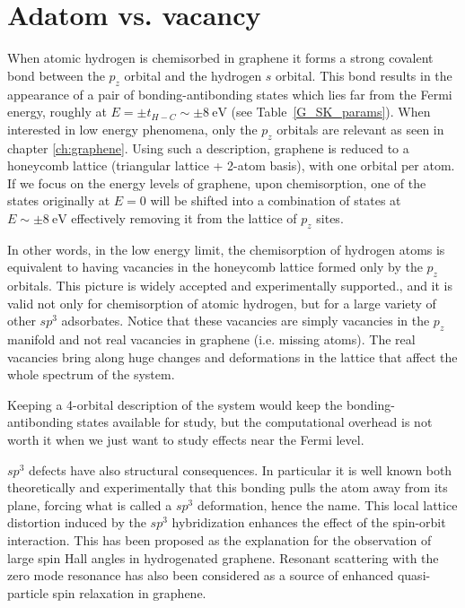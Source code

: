 \section{Adatom vs. vacancy}
When atomic hydrogen is chemisorbed in graphene it forms a strong covalent bond between the $p_z$ orbital and the hydrogen $s$ orbital. This bond results in the appearance of a pair of bonding-antibonding states which lies far from the Fermi energy, roughly at $E=\pm t_{H-C} \sim \pm\SI{8}{\eV}$ (see Table~\ref{G_SK_params}). When interested in low energy phenomena, only the $p_z$ orbitals are relevant as seen in chapter \ref{ch:graphene}. Using such a description, graphene is reduced to a honeycomb lattice (triangular lattice + 2-atom basis), with one orbital per atom.
If we focus on the energy levels of graphene, upon chemisorption, one of the states originally at $E=0$ will be shifted into a combination of states at $E\sim\pm\SI{8}{\eV}$ effectively removing it from the lattice of $p_z$ sites.

In other words, in the low energy limit, the chemisorption of hydrogen atoms is equivalent to having vacancies in the honeycomb lattice formed only by the $p_z$ orbitals.
This picture is widely accepted and experimentally supported.\cite{Pereira2006, Kumazaki2007, Wehling2007, Pereira2008, Palacios2008}, and it is valid not only for chemisorption of atomic hydrogen, but for a large variety of other $sp^3$ adsorbates. \cite{Santos2012}
Notice that these vacancies are simply vacancies in the $p_z$ manifold and not real vacancies in graphene (i.e. missing atoms). The real vacancies bring along huge changes and deformations in the lattice that affect the whole spectrum of the system.

Keeping a 4-orbital description of the system would keep the bonding-antibonding states available for study, but the computational overhead is not worth it when we just want to study effects near the Fermi level.


$sp^3$ defects have also structural consequences. In particular it is well known both theoretically and experimentally that this bonding pulls the  atom away from its plane, forcing what is called a $sp^3$ deformation, hence the name.
This local lattice distortion induced by the $sp^3$ hybridization enhances the effect of the spin-orbit interaction.\cite{Castro2009a,Gmitra2013} This has been proposed as the explanation for the observation of large spin Hall angles in hydrogenated graphene.\cite{Balakrishnan2013} Resonant scattering with the zero mode resonance has also been considered as a source of enhanced quasi-particle spin relaxation in graphene.\cite{Wojtaszek2013, Kochan2014, soriano2015}






